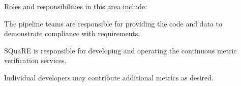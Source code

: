 Roles and responsibilities in this area include:

\begin{itemize_single}

\item The pipeline teams are responsible for providing the code and data to demonstrate compliance with requirements.

\item SQuaRE is responsible for developing and operating the continuous metric verification services.

\item Individual developers may contribute additional metrics as desired.

\end{itemize_single}
